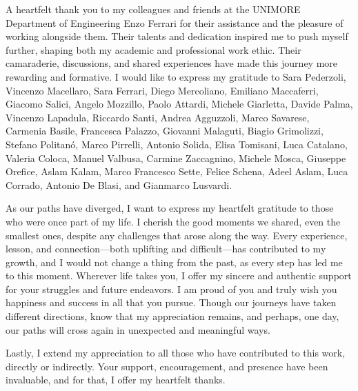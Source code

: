A heartfelt thank you to my colleagues and friends at the UNIMORE Department of Engineering Enzo Ferrari for their assistance and the pleasure of working alongside them. Their talents and dedication inspired me to push myself further, shaping both my academic and professional work ethic. Their camaraderie, discussions, and shared experiences have made this journey more rewarding and formative. I would like to express my gratitude to Sara Pederzoli, Vincenzo Macellaro, Sara Ferrari, Diego Mercoliano, Emiliano Maccaferri, Giacomo Salici, Angelo Mozzillo, Paolo Attardi, Michele Giarletta, Davide Palma, Vincenzo Lapadula, Riccardo Santi, Andrea Agguzzoli, Marco Savarese, Carmenia Basile, Francesca Palazzo, Giovanni Malaguti, Biagio Grimolizzi, Stefano Politanó, Marco Pirrelli, Antonio Solida, Elisa Tomisani, Luca Catalano, Valeria Coloca, Manuel Valbusa, Carmine Zaccagnino, Michele Mosca, Giuseppe Orefice, Aslam Kalam, Marco Francesco Sette, Felice Schena, Adeel Aslam, Luca Corrado, Antonio De Blasi, and Gianmarco Lusvardi.

As our paths have diverged, I want to express my heartfelt gratitude to those who were once part of my life. I cherish the good moments we shared, even the smallest ones, despite any challenges that arose along the way. Every experience, lesson, and connection—both uplifting and difficult—has contributed to my growth, and I would not change a thing from the past, as every step has led me to this moment. Wherever life takes you, I offer my sincere and authentic support for your struggles and future endeavors. I am proud of you and truly wish you happiness and success in all that you pursue. Though our journeys have taken different directions, know that my appreciation remains, and perhaps, one day, our paths will cross again in unexpected and meaningful ways.

Lastly, I extend my appreciation to all those who have contributed to this work, directly or indirectly. Your support, encouragement, and presence have been invaluable, and for that, I offer my heartfelt thanks.

